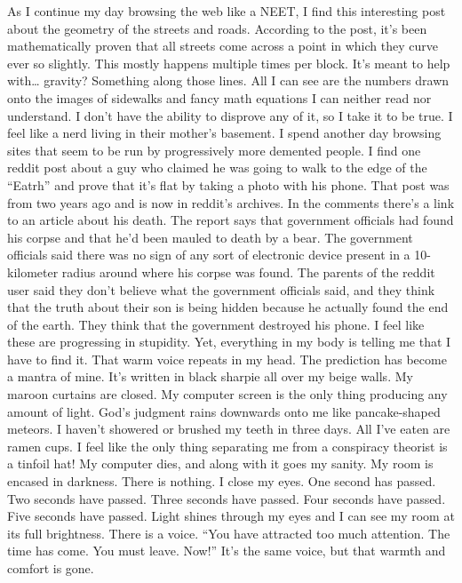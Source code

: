\documentclass[a4paper, 12pt]{book}
\newcommand\tab[1][1cm]{\hspace*{#1}}
\begin{document}
\newline
\tab
As I continue my day browsing the web like a NEET, I find this interesting post about the geometry of the streets and roads. According to the post, it’s been mathematically proven that all streets come across a point in which they curve ever so slightly.  This mostly happens multiple times per block. It’s meant to help with… gravity? Something along those lines. All I can see are the numbers drawn onto the images of sidewalks and fancy math equations I can neither read nor understand. I don’t have the ability to disprove any of it, so I take it to be true.
\newline
\tab
I feel like a nerd living in their mother’s basement. I spend another day browsing sites that seem to be run by progressively more demented people. I find one reddit post about a guy who claimed he was going to walk to the edge of the “Eatrh” and prove that it’s flat by taking a photo with his phone. That post was from two years ago and is now in reddit’s archives. In the comments there’s a link to an article about his death. The report says that government officials had found his corpse and that he’d been mauled to death by a bear. The government officials said there was no sign of any sort of electronic device present in a 10-kilometer radius around where his corpse was found. The parents of the reddit user said they don’t believe what the government officials said, and they think that the truth about their son is being hidden because he actually found the end of the earth. They think that the government destroyed his phone. 
\newline
\tab
I feel like these are progressing in stupidity. Yet, everything in my body is telling me that I have to find it. That warm voice repeats in my head. The prediction has become a mantra of mine. It’s written in black sharpie all over my beige walls. My maroon curtains are closed. My computer screen is the only thing producing any amount of light. God’s judgment rains downwards onto me like pancake-shaped meteors. I haven’t showered or brushed my teeth in three days. All I’ve eaten are ramen cups. I feel like the only thing separating me from a conspiracy theorist is a tinfoil hat! 
\newline
\tab
My computer dies, and along with it goes my sanity. My room is encased in darkness. There is nothing. I close my eyes. One second has passed. Two seconds have passed. Three seconds have passed. Four seconds have passed. Five seconds have passed. Light shines through my eyes and I can see my room at its full brightness. There is a voice. “You have attracted too much attention. The time has come. You must leave. Now!” It’s the same voice, but that warmth and comfort is gone.
\end{document}
